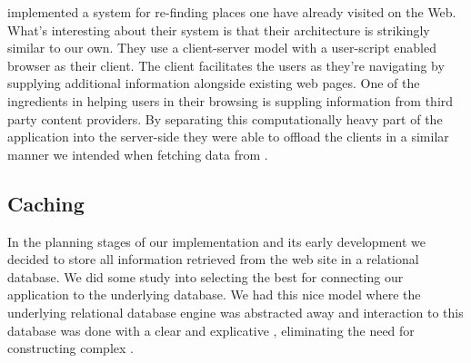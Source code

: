 \citet[--888]{nishimoto06} implemented a system for re-finding places
one have already visited on the Web. What's interesting about their system is
that their architecture is strikingly similar to our own. They use a
client-server model with a user-script enabled browser as their client. The
client facilitates the users as they're navigating by supplying additional
information alongside existing web pages. One of the ingredients in helping
users in their browsing is suppling information from third party content
providers. By separating this computationally heavy part of the application
into the server-side they were able to offload the clients in a similar
manner we intended when fetching data from \urort{}.

\subsection{Caching}
\label{section:implementation.architecture.caching}

In the planning stages of our implementation and its early development we
decided to store all information retrieved from the \urort{} web site
in a relational database. We did some study into selecting the best
%
for connecting our application to the underlying database. We had this nice
model where the underlying relational database engine was abstracted away
and interaction to this database was done with a clear and explicative
%
,
eliminating the need for constructing complex %
.

